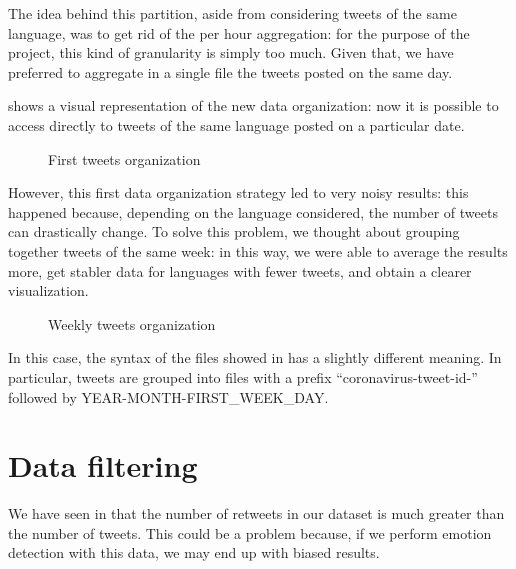 The idea behind this partition, aside from considering tweets of the same language, was to get rid of the per hour aggregation: for the purpose of the project, this kind of granularity is simply too much. Given that, we have preferred to aggregate in a single file the tweets posted on the same day.

 shows a visual representation of the new data organization: now it is possible to access directly to tweets of the same language posted on a particular date.

\begin{figure}[H]
	\caption{First tweets organization}
	\label{fig:tweet-org-1}
\end{figure}

However, this first data organization strategy led to very noisy results: this happened because, depending on the language considered, the number of tweets can drastically change. To solve this problem, we thought about grouping together tweets of the same week: in this way, we were able to average the results more, get stabler data for languages with fewer tweets, and obtain a clearer visualization.

\begin{figure}[H]
	\caption{Weekly tweets organization}
	\label{fig:tweet-org-2}
\end{figure}

In this case, the syntax of the files showed in  has a slightly different meaning. In particular, tweets are grouped into files with a prefix “coronavirus-tweet-id-” followed by YEAR-MONTH-FIRST\_WEEK\_DAY.

\section{Data filtering}
\label{sec:data-filtering}

We have seen in  that the number of retweets in our dataset is much greater than the number of tweets. This could be a problem because, if we perform emotion detection with this data, we may end up with biased results. 

